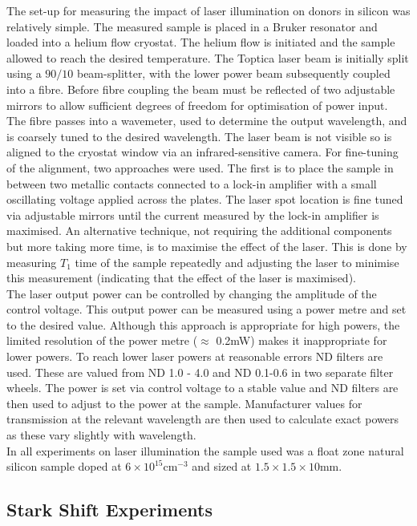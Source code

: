 The set-up for measuring the impact of laser illumination on donors in silicon was relatively simple.
The measured sample is placed in a Bruker resonator and loaded into a helium flow cryostat.
The helium flow is initiated and the sample allowed to reach the desired temperature.
The Toptica laser beam is initially split using a $90/10$ beam-splitter, with the lower power beam subsequently coupled into a fibre.
Before fibre coupling the beam must be reflected of two adjustable mirrors to allow sufficient degrees of freedom for optimisation of power input.
The fibre passes into a wavemeter, used to determine the output wavelength, and is coarsely tuned to the desired wavelength.
The laser beam is not visible so is aligned to the cryostat window via an infrared-sensitive camera.
For fine-tuning of the alignment, two approaches were used.
The first is to place the sample in between two metallic contacts connected to a lock-in amplifier with a small oscillating voltage applied across the plates.
The laser spot location is fine tuned via adjustable mirrors until the current measured by the lock-in amplifier is maximised.
An alternative technique, not requiring the additional components but more taking more time, is to maximise the effect of the laser.
This is done by measuring $T_1$ time of the sample repeatedly and adjusting the laser to minimise this measurement (indicating that the effect of the laser is maximised). 
\\
The laser output power can be controlled by changing the amplitude of the control voltage.
This output power can be measured using a power metre and set to the desired value.
Although this approach is appropriate for high powers, the limited resolution of the power metre ($\approx$ 0.2mW) makes it inappropriate for lower powers.
To reach lower laser powers at reasonable errors ND filters are used.
These are valued from ND 1.0 - 4.0 and ND 0.1-0.6 in two separate filter wheels.
The power is set via control voltage to a stable value and ND filters are then used to adjust to the power at the sample.
Manufacturer values for transmission at the relevant wavelength are then used to calculate exact powers as these vary slightly with wavelength.
\\
In all experiments on laser illumination the sample used was a float zone natural silicon sample doped at $6\times10^{15}\text{cm}^{-3}$ and sized at $1.5\times1.5\times10$mm.

\subsection{Stark Shift Experiments}

